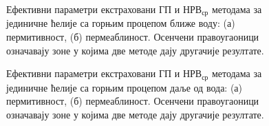 \documentclass[main.tex]{subfiles}
\begin{document}
\begin{figure}[!t]
\centering
{}\hfill
{}
\caption{Ефективни параметри екстраховани ГП и $НРВ_{ср}$ методама за јединичне ћелије са горњим процепом ближе воду: (а) пермитивност, (б) пермеаблиност. Осенчени правоугаоници означавају зоне у којима две методе дају другачије резултате.}
\label{fig14_2}
\end{figure}
\begin{figure}[!t]
\centering
{}\hfill
{}
\caption{Ефективни параметри екстраховани ГП и $НРВ_{ср}$ методама за јединичне ћелије са горњим процепом даље од вода: (а) пермитивност, (б) пермеаблиност. Осенчени правоугаоници означавају зоне у којима две методе дају другачије резултате.}
\label{fig14_3}
\end{figure}
\end{document}
